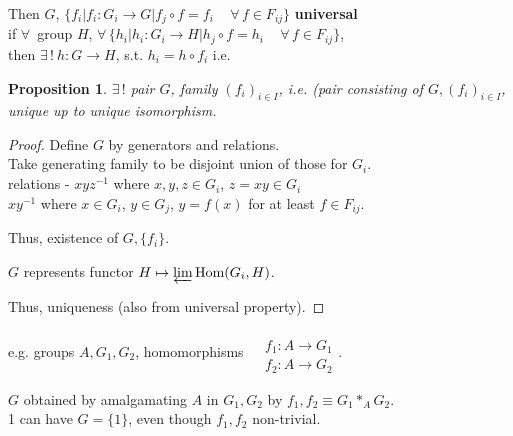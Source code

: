 \documentclass[10pt]{amsart}
\newtheorem{proposition}{Proposition}
\begin{document}
\begin{multicols*}{2}
Then $G$,  $\lbrace f_i | f_i : G_i \to G  |  f_j \circ f = f_i \quad \, \forall \, f \in F_{ij} \rbrace$ \textbf{universal} \\
\phantom{Then } if $\forall \, $ group $H$, $\forall \, \lbrace h_i |  h_i : G_i \to H  | h_j \circ f = h_i \quad \, \forall \, f \in F_{ij} \rbrace$, \\
\phantom{Then if } then $\exists \, ! \  h : G\to H$, s.t. $h_i = h \circ f_i$ i.e. 






\begin{proposition}
	$\exists \, !$ pair $G$, family $(f_i)_{i\in I}$, i.e. (pair consisting of $G, (f_i)_{i\in I}$, unique up to unique isomorphism.  
\end{proposition}
\begin{proof}
Define $G$ by generators and relations.  \\
Take generating family to be disjoint union of those for $G_i$.  \\
relations - $xyz^{-1}$ where $x,y,z \in G_i$, $z=xy \in G_i$ \\
\phantom{relations - } $xy^{-1}$ where $x\in G_i$, $y \in G_j$, $y=f(x)$ for at least $f\in F_{ij}$.  

Thus, existence of $G,\lbrace f_i\rbrace$.  

$G$ represents functor $H\mapsto \varprojlim \text{Hom}{(G_i,H)}$.  

Thus, uniqueness (also from universal property).  
\end{proof}

e.g. groups $A,G_1,G_2$, homomorphisms $\begin{aligned} & \quad \\ 
& f_1 : A \to G_1 \\
& f_2 : A \to G_2 
\end{aligned}$.  

$G$ obtained by amalgamating $A$ in $G_1,G_2$ by $f_1,f_2 \equiv G_1 *_A G_2$.  \\
1 can have $G=\lbrace 1 \rbrace$, even though $f_1,f_2$ non-trivial.  


\end{multicols*}
\end{document}

